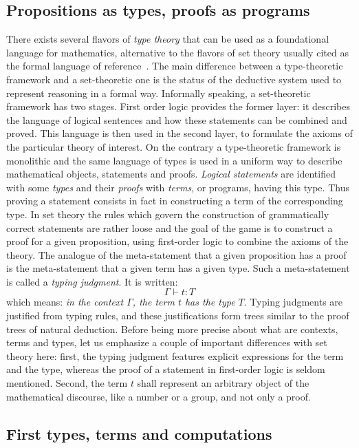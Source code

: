 \subsection{Propositions as types, proofs as programs}
There exists several flavors of \emph{type theory} that can be used
as a foundational language for mathematics, alternative to the
flavors of set theory usually cited as the formal language of
reference~\cite{bourbaki-sets}.
The main difference between a type-theoretic framework and
a set-theoretic one is the status of the deductive system used to
represent reasoning in a formal way. Informally speaking, a
set-theoretic framework has two stages. First order logic provides
the former layer: it describes the language of logical sentences and how
these statements can be combined and proved. This language is then
used in the second layer, to formulate the axioms of the particular
theory of interest.
On the contrary a type-theoretic framework is monolithic and the
same language of types is used in a uniform way to describe
mathematical objects, statements and proofs. \emph{Logical statements}
are identified with some \emph{types} and their \emph{proofs} with
\emph{terms}, or programs, having this type. Thus proving a statement
consists in fact in constructing a term of the corresponding type. In
set theory the rules which govern the construction of
grammatically correct statements are rather loose and the goal of the
game is to construct a proof for a given proposition, using
first-order logic to combine the axioms of the theory.
The analogue of the meta-statement that a given
proposition has a proof is the meta-statement that a given term has a
given type. Such a meta-statement is called a \emph{typing
  judgment}. It is written:
$$\Gamma \vdash t : T$$
which means:
\emph{in the context $\Gamma$, the term $t$ has the type $T$}.
Typing judgments are justified from typing rules, and these
justifications form trees similar to the proof trees of natural deduction.
Before being more precise about what are contexts, terms and types,
let us emphasize a couple of important differences with set theory
here: first, the typing judgment features explicit expressions for
the term and the type, whereas the proof of a statement in first-order
logic is seldom mentioned. Second, the term $t$ shall represent an
arbitrary object of the mathematical discourse, like a number or a
group, and not only a proof.


\subsection{First types, terms and computations}\label{ssec:terms}

